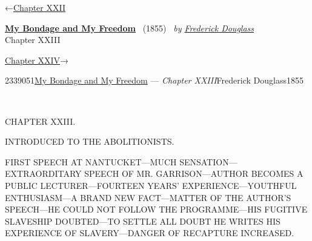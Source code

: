\hypertarget{headerContainer}{}
\hypertarget{navigationHeader}{}
\protect\hypertarget{headerprevious}{}{←\href{/wiki/My_Bondage_and_My_Freedom_(1855)/Chapter_XXII}{Chapter
XXII}}

\textbf{\protect\hypertarget{header_title_text}{}{\href{/wiki/My_Bondage_and_My_Freedom_(1855)}{My
Bondage and My Freedom}}} ~(1855)~ \emph{by
\href{/wiki/Author:Frederick_Douglass}{\protect\hypertarget{header_author_text}{}{{Frederick
Douglass}}}}\\
\protect\hypertarget{header_section_text}{}{Chapter XXIII}

\protect\hypertarget{headernext}{}{\href{/wiki/My_Bondage_and_My_Freedom_(1855)/Chapter_XXIV}{Chapter
XXIV}→}

\hypertarget{navigationNotes}{}

\hypertarget{ws-data}{}
\protect\hypertarget{ws-article-id}{}{2339051}\protect\hypertarget{ws-title}{}{\href{/wiki/My_Bondage_and_My_Freedom_(1855)}{My
Bondage and My Freedom} --- \emph{Chapter
XXIII}}\protect\hypertarget{ws-author}{}{Frederick
Douglass}\protect\hypertarget{ws-year}{}{1855}

{\protect\hypertarget{357}{}{}}

~

{CHAPTER XXIII.}

INTRODUCED TO THE ABOLITIONISTS.

{FIRST SPEECH AT NANTUCKET---MUCH SENSATION---{EXTRAORDITARY} SPEECH OF
MR. GARRISON---AUTHOR BECOMES A PUBLIC LECTURER---FOURTEEN YEARS'
EXPERIENCE---YOUTHFUL ENTHUSIASM---A BRAND NEW FACT---MATTER OF THE
AUTHOR'S SPEECH---HE COULD NOT FOLLOW THE PROGRAMME---HIS FUGITIVE
SLAVESHIP DOUBTED---TO SETTLE ALL DOUBT HE WRITES HIS EXPERIENCE OF
SLAVERY---DANGER OF RECAPTURE INCREASED.}


